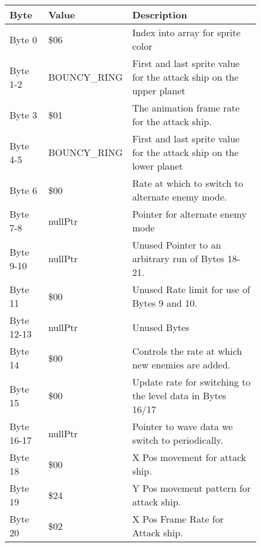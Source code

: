 \begin{figure}[H]
  {
  \setlength{\tabcolsep}{3.0pt}
  \setlength\cmidrulewidth{\heavyrulewidth} %
  \begin{adjustbox}{width=12cm}

\begin{tabular}{lll}
\toprule
 Byte       & Value             & Description                                                         \\
\midrule
 Byte 0     & \$06               & Index into array for sprite color                                   \\
 Byte 1-2   & BOUNCY\_RING       & First and last sprite value for the attack ship on the upper planet \\
 Byte 3     & \$01               & The animation frame rate for the attack ship.                       \\
 Byte 4-5   & BOUNCY\_RING       & First and last sprite value for the attack ship on the lower planet \\
 Byte 6     & \$00               & Rate at which to switch to alternate enemy mode.                    \\
 Byte 7-8   & nullPtr           & Pointer for alternate enemy mode                                    \\
 Byte 9-10  & nullPtr           & Unused Pointer to an arbitrary run of Bytes 18-21.                  \\
 Byte 11    & \$00               & Unused Rate limit for use of Bytes 9 and 10.                        \\
 Byte 12-13 & nullPtr           & Unused Bytes                                                        \\
 Byte 14    & \$00               & Controls the rate at which new enemies are added.                   \\
 Byte 15    & \$00               & Update rate for switching to the level data in Bytes 16/17          \\
 Byte 16-17 & nullPtr           & Pointer to wave data we switch to periodically.                     \\
 Byte 18    & \$00               & X Pos movement for attack ship.                                     \\
 Byte 19    & \$24               & Y Pos movement pattern for attack ship.                             \\
 Byte 20    & \$02               & X Pos Frame Rate for Attack ship.                                   \\

\end{tabular}
\end{adjustbox}}
\end{figure}
